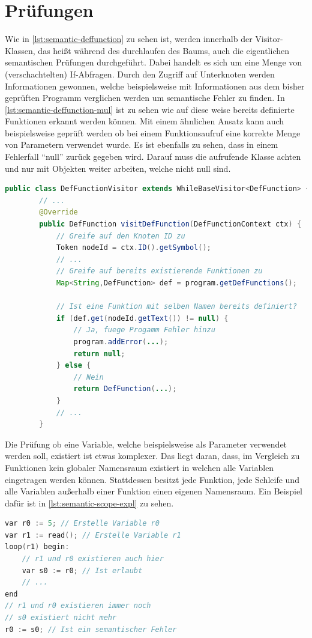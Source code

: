 \section{Prüfungen}
Wie in \cref{lst:semantic-deffunction} zu sehen ist, werden innerhalb der Visitor-Klassen, das heißt während des durchlaufen des Baums, auch die eigentlichen semantischen Prüfungen durchgeführt. Dabei handelt es sich um eine Menge von (verschachtelten) If-Abfragen. Durch den Zugriff auf Unterknoten werden Informationen gewonnen, welche beispielsweise mit Informationen aus dem bisher geprüften Programm verglichen werden um semantische Fehler zu finden. In \cref{lst:semantic-deffunction-mul} ist zu sehen wie auf diese weise bereits definierte Funktionen erkannt werden können. Mit einem ähnlichen Ansatz kann auch beispielsweise geprüft werden ob bei einem Funktionsaufruf eine korrekte Menge von Parametern verwendet wurde. Es ist ebenfalls zu sehen, dass in einem Fehlerfall \enquote{null} zurück gegeben wird. Darauf muss die aufrufende Klasse achten und nur mit Objekten weiter arbeiten, welche nicht null sind.

\begin{lstlisting}[language=java, caption=Erkenne bereits definierte Funktionen, label={lst:semantic-deffunction-mul}]
	public class DefFunctionVisitor extends WhileBaseVisitor<DefFunction> {
		// ...
		@Override
		public DefFunction visitDefFunction(DefFunctionContext ctx) {
			// Greife auf den Knoten ID zu
			Token nodeId = ctx.ID().getSymbol();
			// ...
			// Greife auf bereits existierende Funktionen zu
			Map<String,DefFunction> def = program.getDefFunctions();
			
			// Ist eine Funktion mit selben Namen bereits definiert?
			if (def.get(nodeId.getText()) != null) {
				// Ja, fuege Progamm Fehler hinzu
				program.addError(...);
				return null;
			} else {
				// Nein
				return DefFunction(...);
			}
			// ...
		}
\end{lstlisting}

Die Prüfung ob eine Variable, welche beispielsweise als Parameter verwendet werden soll, existiert ist etwas komplexer. Das liegt daran, dass, im Vergleich zu Funktionen kein globaler Namensraum existiert in welchen alle Variablen eingetragen werden können. Stattdessen besitzt jede Funktion, jede Schleife und alle Variablen außerhalb einer Funktion einen eigenen Namensraum. Ein Beispiel dafür ist in \cref{lst:semantic-scope-expl} zu sehen.

\begin{lstlisting}[language=c, caption=Scope Beispiel, label={lst:semantic-scope-expl}]
var r0 := 5; // Erstelle Variable r0
var r1 := read(); // Erstelle Variable r1
loop(r1) begin: 
	// r1 und r0 existieren auch hier
	var s0 := r0; // Ist erlaubt
	// ... 
end
// r1 und r0 existieren immer noch
// s0 existiert nicht mehr
r0 := s0; // Ist ein semantischer Fehler
\end{lstlisting}

